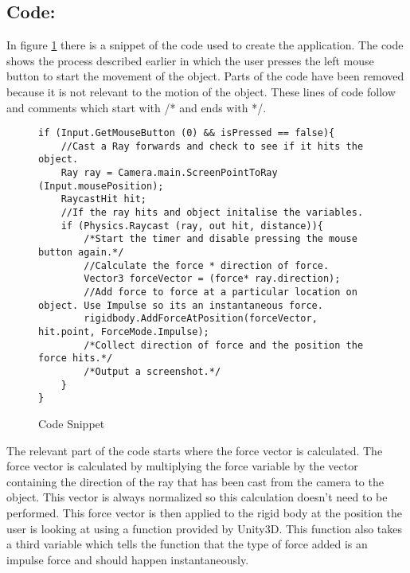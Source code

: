 \subsection{Code:}\label{sc:Code}
In figure \ref*{sc:SourceCode} there is a snippet of the code used to create the application.
The code shows the process described earlier in which the user presses the left mouse button to start the movement of the object.
Parts of the code have been removed because it is not relevant to the motion of the object.
These lines of code follow and comments which start with /* and ends with */. 

\begin{figure}[H]
\centering
\begin{lstlisting}
if (Input.GetMouseButton (0) && isPressed == false){
	//Cast a Ray forwards and check to see if it hits the object.
	Ray ray = Camera.main.ScreenPointToRay (Input.mousePosition);
	RaycastHit hit;
	//If the ray hits and object initalise the variables.
	if (Physics.Raycast (ray, out hit, distance)){
		/*Start the timer and disable pressing the mouse button again.*/
		//Calculate the force * direction of force.
		Vector3 forceVector = (force* ray.direction);
		//Add force to force at a particular location on object. Use Impulse so its an instantaneous force.
		rigidbody.AddForceAtPosition(forceVector, hit.point, ForceMode.Impulse);
		/*Collect direction of force and the position the force hits.*/
		/*Output a screenshot.*/
	}
}
\end{lstlisting}
\caption{Code Snippet}
\label{sc:SourceCode}
\end{figure}

The relevant part of the code starts where the force vector is calculated.
The force vector is calculated by multiplying the force variable by the vector containing the direction of the ray that has been cast from the camera to the object.
This vector is always normalized so this calculation doesn't need to be performed.
This force vector is then applied to the rigid body at the position the user is looking at using a function provided by Unity3D.
This function also takes a third variable which tells the function that the type of force added is an impulse force and should happen instantaneously.